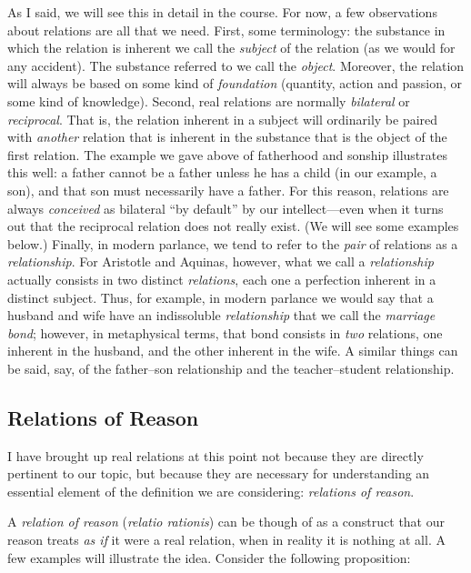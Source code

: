\documentclass[
  12pt,
]{memoir}
\begin{document}
As I said, we will see this in detail in the course. For now, a few
observations about relations are all that we need. First, some
terminology: the substance in which the relation is inherent we call the
\emph{subject} of the relation (as we would for any accident). The
substance referred to we call the \emph{object}. Moreover, the relation
will always be based on some kind of \emph{foundation} (quantity, action
and passion, or some kind of knowledge). Second, real relations are
normally \emph{bilateral} or \emph{reciprocal}. That is, the relation
inherent in a subject will ordinarily be paired with \emph{another}
relation that is inherent in the substance that is the object of the
first relation. The example we gave above of fatherhood and sonship
illustrates this well: a father cannot be a father unless he has a child
(in our example, a son), and that son must necessarily have a father.
For this reason, relations are always \emph{conceived} as bilateral ``by
default'' by our intellect---even when it turns out that the reciprocal
relation does not really exist. (We will see some examples below.)
Finally, in modern parlance, we tend to refer to the \emph{pair} of
relations as a \emph{relationship}. For Aristotle and Aquinas, however,
what we call a \emph{relationship} actually consists in two distinct
\emph{relations}, each one a perfection inherent in a distinct subject.
Thus, for example, in modern parlance we would say that a husband and
wife have an indissoluble \emph{relationship} that we call the
\emph{marriage bond}; however, in metaphysical terms, that bond consists
in \emph{two} relations, one inherent in the husband, and the other
inherent in the wife. A similar things can be said, say, of the
father--son relationship and the teacher--student relationship.

\subsection{Relations of Reason}\label{relations-of-reason}

I have brought up real relations at this point not because they are
directly pertinent to our topic, but because they are necessary for
understanding an essential element of the definition we are considering:
\emph{relations of reason}.

A \emph{relation of reason} (\emph{relatio rationis}) can be though of
as a construct that our reason treats \emph{as if} it were a real
relation, when in reality it is nothing at all. A few examples will
illustrate the idea. Consider the following proposition:
\end{document}
